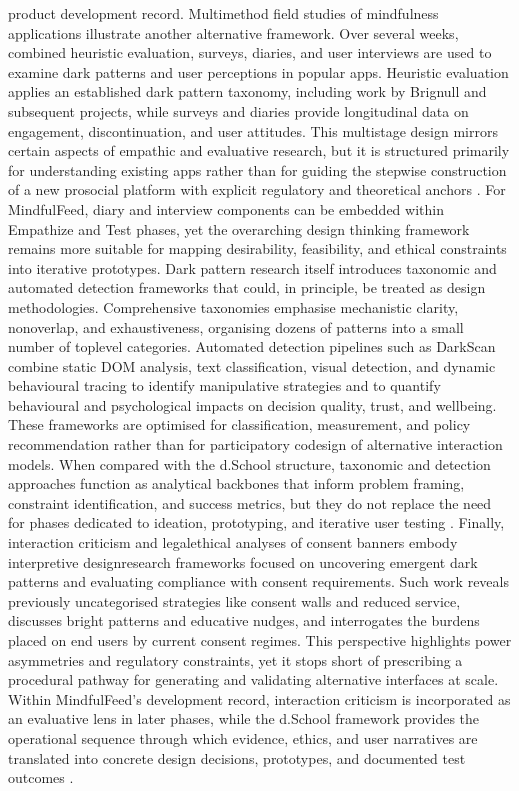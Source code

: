 \documentclass{article}
\begin{document}
product development record. Multi\-method field studies of mindfulness applications illustrate another alternative framework. Over several weeks, combined heuristic evaluation, surveys, diaries, and user interviews are used to examine dark patterns and user perceptions in popular apps. Heuristic evaluation applies an established dark pattern taxonomy, including work by Brignull and subsequent projects, while surveys and diaries provide longitudinal data on engagement, discontinuation, and user attitudes. This multi\-stage design mirrors certain aspects of empathic and evaluative research, but it is structured primarily for understanding existing apps rather than for guiding the stepwise construction of a new pro\-social platform with explicit regulatory and theoretical anchors \parencites[2]{7173856}[4]{7173856}. For MindfulFeed, diary and interview components can be embedded within Empathize and Test phases, yet the overarching design thinking framework remains more suitable for mapping desirability, feasibility, and ethical constraints into iterative prototypes. Dark pattern research itself introduces taxonomic and automated detection frameworks that could, in principle, be treated as design methodologies. Comprehensive taxonomies emphasise mechanistic clarity, non\-overlap, and exhaustiveness, organising dozens of patterns into a small number of top\-level categories. Automated detection pipelines such as DarkScan combine static DOM analysis, text classification, visual detection, and dynamic behavioural tracing to identify manipulative strategies and to quantify behavioural and psychological impacts on decision quality, trust, and well\-being. These frameworks are optimised for classification, measurement, and policy recommendation rather than for participatory co\-design of alternative interaction models. When compared with the d.School structure, taxonomic and detection approaches function as analytical backbones that inform problem framing, constraint identification, and success metrics, but they do not replace the need for phases dedicated to ideation, prototyping, and iterative user testing \parencites[2]{4807303}. Finally, interaction criticism and legal\-ethical analyses of consent banners embody interpretive design\-research frameworks focused on uncovering emergent dark patterns and evaluating compliance with consent requirements. Such work reveals previously uncategorised strategies like consent walls and reduced service, discusses bright patterns and educative nudges, and interrogates the burdens placed on end users by current consent regimes. This perspective highlights power asymmetries and regulatory constraints, yet it stops short of prescribing a procedural pathway for generating and validating alternative interfaces at scale. Within MindfulFeed's development record, interaction criticism is incorporated as an evaluative lens in later phases, while the d.School framework provides the operational sequence through which evidence, ethics, and user narratives are translated into concrete design decisions, prototypes, and documented test outcomes \parencites[15]{5678011}.
\end{document}
